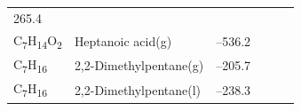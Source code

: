 \documentclass[
  9pt,
]{extbook}
\theoremstyle{definition}
\theoremstyle{definition}
\theoremstyle{definition}
\theoremstyle{remark}
\begin{document}
\begin{longtable}[]{@{}llllll@{}}
\begin{minipage}[t]{0.14\columnwidth}
265.4\strut
\end{minipage}\tabularnewline
\begin{minipage}[t]{0.07\columnwidth}\raggedright
C\textsubscript{7}H\textsubscript{14}O\textsubscript{2}\strut
\end{minipage} & \begin{minipage}[t]{0.17\columnwidth}\raggedright
Heptanoic acid(g)\strut
\end{minipage} & \begin{minipage}[t]{0.15\columnwidth}\raggedright
--536.2\strut
\end{minipage} & \begin{minipage}[t]{0.15\columnwidth}\raggedright
\strut
\end{minipage} & \begin{minipage}[t]{0.14\columnwidth}\raggedright
\strut
\end{minipage} & \begin{minipage}[t]{0.14\columnwidth}\raggedright
\strut
\end{minipage}\tabularnewline
\begin{minipage}[t]{0.07\columnwidth}\raggedright
C\textsubscript{7}H\textsubscript{16}\strut
\end{minipage} & \begin{minipage}[t]{0.17\columnwidth}\raggedright
2,2-Dimethylpentane(g)\strut
\end{minipage} & \begin{minipage}[t]{0.15\columnwidth}\raggedright
--205.7\strut
\end{minipage} & \begin{minipage}[t]{0.15\columnwidth}\raggedright
\strut
\end{minipage} & \begin{minipage}[t]{0.14\columnwidth}\raggedright
\strut
\end{minipage} & \begin{minipage}[t]{0.14\columnwidth}\raggedright
\strut
\end{minipage}\tabularnewline
\begin{minipage}[t]{0.07\columnwidth}\raggedright
C\textsubscript{7}H\textsubscript{16}\strut
\end{minipage} & \begin{minipage}[t]{0.17\columnwidth}\raggedright
2,2-Dimethylpentane(l)\strut
\end{minipage} & \begin{minipage}[t]{0.15\columnwidth}\raggedright
--238.3\strut
\end{minipage} & \begin{minipage}[t]{0.15\columnwidth}\raggedright

\end{minipage}
\end{longtable}
\end{document}
